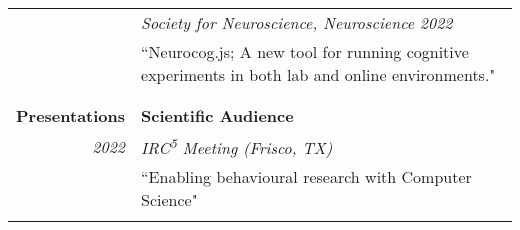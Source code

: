 \documentclass{article}
\begin{document}
\begin{longtable}{r | p{13cm}}
											& \large\textit{Society for Neuroscience, Neuroscience 2022}\\
											& ``Neurocog.js; A new tool for running cognitive experiments in both lab and online environments."  \\
											& \\
											
											

											\hline \\
											
		\large\textbf{Presentations}		& \large\textbf{Scientific Audience} \\
		\large\textit{2022}					& \large\textit{IRC\textsuperscript{5} Meeting (Frisco, TX)} \\
											& ``Enabling behavioural research with Computer Science" \\	
											& \\

											\hline

%
%
	\end{longtable}
\end{document}

